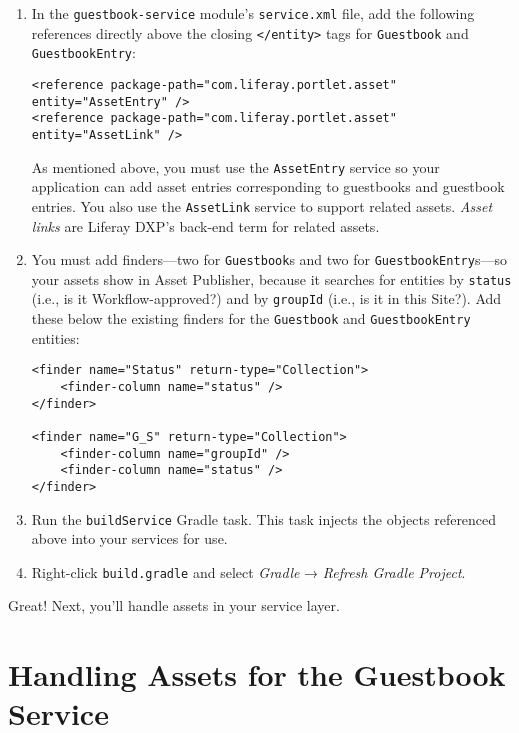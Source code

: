 \begin{enumerate}
\def\labelenumi{\arabic{enumi}.}
\item
  In the \texttt{guestbook-service} module's \texttt{service.xml} file,
  add the following references directly above the closing
  \texttt{\textless{}/entity\textgreater{}} tags for \texttt{Guestbook}
  and \texttt{GuestbookEntry}:

\begin{verbatim}
<reference package-path="com.liferay.portlet.asset" entity="AssetEntry" />
<reference package-path="com.liferay.portlet.asset" entity="AssetLink" />
\end{verbatim}

  As mentioned above, you must use the \texttt{AssetEntry} service so
  your application can add asset entries corresponding to guestbooks and
  guestbook entries. You also use the \texttt{AssetLink} service to
  support related assets. \emph{Asset links} are Liferay DXP's back-end
  term for related assets.
\item
  You must add finders---two for \texttt{Guestbook}s and two for
  \texttt{GuestbookEntry}s---so your assets show in Asset Publisher,
  because it searches for entities by \texttt{status} (i.e., is it
  Workflow-approved?) and by \texttt{groupId} (i.e., is it in this
  Site?). Add these below the existing finders for the
  \texttt{Guestbook} and \texttt{GuestbookEntry} entities:

\begin{verbatim}
<finder name="Status" return-type="Collection">
    <finder-column name="status" />
</finder>

<finder name="G_S" return-type="Collection">
    <finder-column name="groupId" />
    <finder-column name="status" />
</finder>
\end{verbatim}
\item
  Run the \texttt{buildService} Gradle task. This task injects the
  objects referenced above into your services for use.
\item
  Right-click \texttt{build.gradle} and select \emph{Gradle} →
  \emph{Refresh Gradle Project}.
\end{enumerate}

Great! Next, you'll handle assets in your service layer.

\chapter{Handling Assets for the Guestbook
Service}\label{handling-assets-for-the-guestbook-service}

